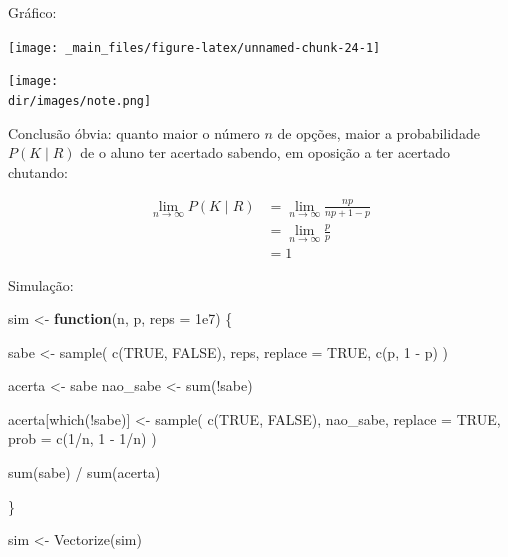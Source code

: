 \documentclass[
  11pt]{report}
\newenvironment{Shaded}{\begin{snugshade}}{\end{snugshade}}
\newcommand{\AttributeTok}[1]{\textcolor[rgb]{0.77,0.63,0.00}{#1}}
\newcommand{\ConstantTok}[1]{\textcolor[rgb]{0.00,0.00,0.00}{#1}}
\newcommand{\ControlFlowTok}[1]{\textcolor[rgb]{0.13,0.29,0.53}{\textbf{#1}}}
\newcommand{\DecValTok}[1]{\textcolor[rgb]{0.00,0.00,0.81}{#1}}
\newcommand{\FloatTok}[1]{\textcolor[rgb]{0.00,0.00,0.81}{#1}}
\newcommand{\FunctionTok}[1]{\textcolor[rgb]{0.00,0.00,0.00}{#1}}
\newcommand{\NormalTok}[1]{#1}
\newcommand{\OtherTok}[1]{\textcolor[rgb]{0.56,0.35,0.01}{#1}}
\newcommand{\SpecialCharTok}[1]{\textcolor[rgb]{0.00,0.00,0.00}{#1}}
\newcommand{\dir}{/ssd/R/x86_64-pc-linux-gnu-library/4.1/fnaufelRmd/rmarkdown/resources}
\newenvironment{rmdnote}
{
  \begin{mynote}
    \texttt{[image: \\dir/images/note.png]}
    \tcblower
  }
  {
  \end{mynote}
}
\renewenvironment{Shaded}{
    \begin{mdframed}[%
      roundcorner=2pt,%
      innerleftmargin=5pt,%
      innerrightmargin=5pt,%
      topline=true,%
      leftline=true,%
      rightline=true,%
      bottomline=true,%
      linewidth=0.5pt,%
      linecolor=black!20,%
      backgroundcolor=black!2,%
      skipabove=2ex,%
      skipbelow=2.5ex%
    ]%
  }
  {
    \end{mdframed}
  }
\begin{document}
Gráfico:

\begin{center}\texttt{[image: \_main\_files/figure-latex/unnamed-chunk-24-1]} \end{center}

\begin{rmdnote}
Conclusão óbvia: quanto maior o número $n$ de opções, maior a probabilidade $P(K \mid R)$ de o aluno ter acertado sabendo, em oposição a ter acertado chutando:

\[
\begin{aligned}
\lim_{n \to \infty} P(K \mid R) 
&=
\lim_{n \to \infty} \frac{np}{np + 1 - p} \\
&=
\lim_{n \to \infty} \frac{p}{p} \\
&= 1
\end{aligned}
\]

\end{rmdnote}

Simulação:

\begin{Shaded}
\begin{Highlighting}[]
\NormalTok{sim }\OtherTok{\textless{}{-}} \ControlFlowTok{function}\NormalTok{(n, p, }\AttributeTok{reps =} \FloatTok{1e7}\NormalTok{) \{}
  
\NormalTok{  sabe }\OtherTok{\textless{}{-}} \FunctionTok{sample}\NormalTok{(}
    \FunctionTok{c}\NormalTok{(}\ConstantTok{TRUE}\NormalTok{, }\ConstantTok{FALSE}\NormalTok{), }
\NormalTok{    reps,}
    \AttributeTok{replace =} \ConstantTok{TRUE}\NormalTok{,}
    \FunctionTok{c}\NormalTok{(p, }\DecValTok{1} \SpecialCharTok{{-}}\NormalTok{ p)}
\NormalTok{  )}

\NormalTok{  acerta }\OtherTok{\textless{}{-}}\NormalTok{ sabe}
\NormalTok{  nao\_sabe }\OtherTok{\textless{}{-}} \FunctionTok{sum}\NormalTok{(}\SpecialCharTok{!}\NormalTok{sabe)}
  
\NormalTok{  acerta[}\FunctionTok{which}\NormalTok{(}\SpecialCharTok{!}\NormalTok{sabe)] }\OtherTok{\textless{}{-}} 
    \FunctionTok{sample}\NormalTok{(}
      \FunctionTok{c}\NormalTok{(}\ConstantTok{TRUE}\NormalTok{, }\ConstantTok{FALSE}\NormalTok{),}
\NormalTok{      nao\_sabe,}
      \AttributeTok{replace =} \ConstantTok{TRUE}\NormalTok{,}
      \AttributeTok{prob =} \FunctionTok{c}\NormalTok{(}\DecValTok{1}\SpecialCharTok{/}\NormalTok{n, }\DecValTok{1} \SpecialCharTok{{-}} \DecValTok{1}\SpecialCharTok{/}\NormalTok{n)}
\NormalTok{    )}
  
  \FunctionTok{sum}\NormalTok{(sabe) }\SpecialCharTok{/} \FunctionTok{sum}\NormalTok{(acerta)}
  
\NormalTok{\}}

\NormalTok{sim }\OtherTok{\textless{}{-}} \FunctionTok{Vectorize}\NormalTok{(sim)}
\end{Highlighting}
\end{Shaded}
\end{document}
